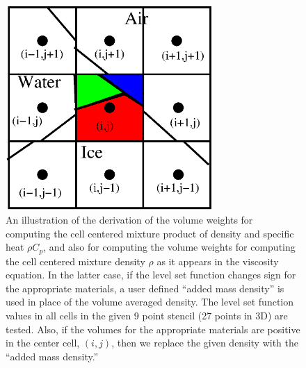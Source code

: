 \documentclass[]{article}
\begin{document}
%
\begin{figure}[htbp] 
  \centering
    \includegraphics[width=0.7\textwidth]{dencell_mixture.eps}
  \caption{
   An illustration of the derivation of the volume weights for
   computing the cell centered
   mixture product of density and specific
   heat $\rho C_{p}$, and also for computing the volume weights for
   computing the cell centered
   mixture density $\rho$ as it appears in the 
   viscosity equation.  In the latter case, 
   if the level set
   function changes sign for the appropriate materials, a 
   user defined ``added mass density'' is used in place of the
   volume averaged density.  The level set function values in all
   cells in the given 9 point stencil (27 points in 3D)
   are tested.  Also, if the 
   volumes for the appropriate materials are positive in the
   center cell, $(i,j)$, then we replace the given density
   with the ``added mass density.''
   }
  \label{dencell_mixture} 
\end{figure}
\end{document}
